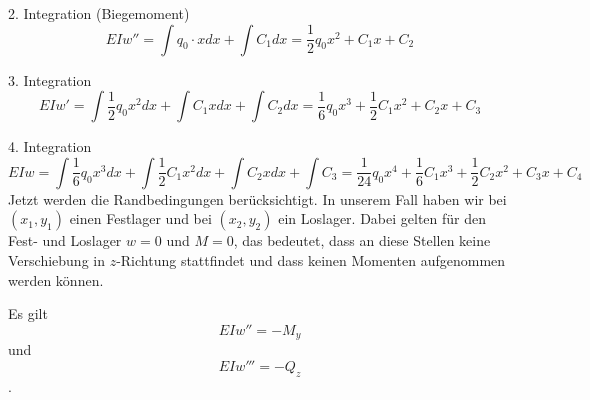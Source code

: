 2. Integration (Biegemoment)
\begin{equation}
	EIw''=
	\int{q_0\cdot x}dx+\int C_1dx=
	\frac{1}{2}q_0x^2+C_1x+C_2
\end{equation}

3. Integration
\begin{equation}
	EIw'=
	\int{\frac{1}{2}q_0x^2}dx+\int{C_1x}dx+\int C_2dx=
	\frac{1}{6}q_0x^3+\frac{1}{2}C_1x^2+C_2x+C_3
\end{equation}

4. Integration
\begin{equation}
	EIw=
	\int{\frac{1}{6}q_0x^3}dx+\int{\frac{1}{2}C_1x^2}dx+\int{C_2x}dx+\int C_3=
	\frac{1}{24}q_0x^4+\frac{1}{6}C_1x^3+\frac{1}{2}C_2x^2+C_3x+C_4
\end{equation}
Jetzt werden die Randbedingungen berücksichtigt.
In unserem Fall haben wir bei $(x_1, y_1)$ einen Festlager und bei $(x_2, y_2)$ ein Loslager.
Dabei gelten für den Fest- und Loslager $w = 0$ und $M = 0$, das bedeutet, dass an diese Stellen keine Verschiebung in $z$-Richtung stattfindet und dass keinen Momenten aufgenommen werden können.

Es gilt
\begin{equation}
	EIw'' =
	-M_y
\end{equation}
und
\begin{equation}
	EIw'''=
	-Q_z
\end{equation}.

